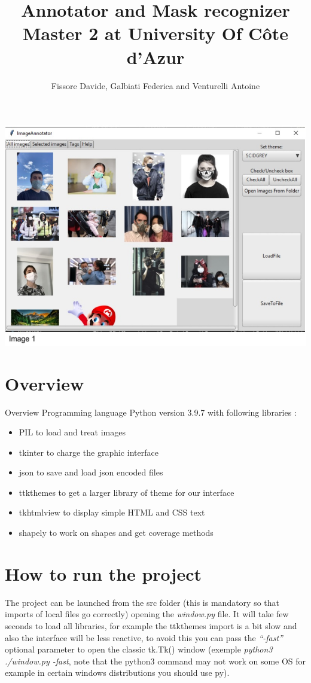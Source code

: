 \documentclass[a4paper, 11pt]{article}
\begin{document}
\title{
  Annotator and Mask recognizer \\
  \large Master 2 at University Of Côte d'Azur
}
\author{Fissore Davide, Galbiati Federica and Venturelli Antoine}
\maketitle
\tableofcontents


\includegraphics[scale=.6]{images_latex/Image_annotator.jpg}

\section{Overview}
Overview
Programming language Python version 3.9.7 with following libraries :
\begin{itemize}
  \item PIL to load and treat images
  \item tkinter to charge the graphic interface
  \item json to save and load json encoded files
  \item ttkthemes to get a larger library of theme for our interface
  \item tkhtmlview to display simple HTML and CSS text
  \item shapely to work on shapes and get coverage methods
\end{itemize}

\section{How to run the project}
The project can be launched from the src folder (this is mandatory so that imports of local
files go correctly) opening the  \textit{window.py}  file. It  will take few seconds to load all libraries, for
example the ttkthemes import is a bit slow and also the interface will be less reactive, to
avoid this you can pass the  \textit{“-fast”}  optional parameter  to open the classic tk.Tk() window
(exemple  \textit{python3 ./window.py -fast},  note that the  python3 command may not work on
some OS for example in certain windows distributions you should use py).
\end{document}
